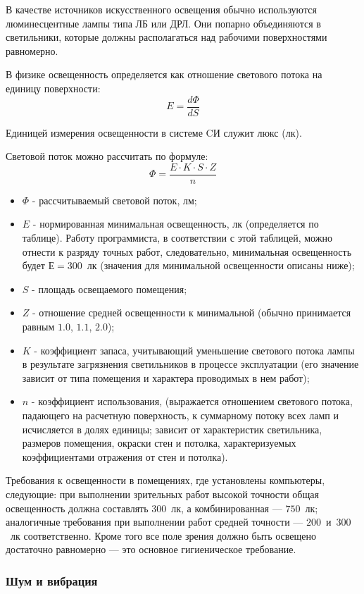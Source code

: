 В качестве источников искусственного освещения обычно
используются люминесцентные лампы типа ЛБ или ДРЛ. Они попарно
объединяются в светильники, которые должны располагаться над рабочими
поверхностями равномерно.

В физике освещенность определяется как отношение светового потока на
единицу поверхности:
\[
	E = \dfrac{d \Phi}{d S}
\]

Единицей измерения освещенности в системе CИ служит люкс (лк).

Световой поток можно рассчитать по формуле:
\[
	\Phi = \dfrac{E \cdot K \cdot S \cdot Z}{n}
\]

\begin{itemize}
	\item  $\Phi$ - рассчитываемый световой поток, лм;
	\item  $E$ - нормированная минимальная освещенность, лк (определяется по
		таблице). Работу программиста, в соответствии с этой таблицей, можно отнести
		к разряду точных работ, следовательно, минимальная освещенность будет $Е =
		300$~лк (значения для минимальной освещенности описаны ниже);
	\item  $S$ - площадь освещаемого помещения;
	\item  $Z$ - отношение средней освещенности к минимальной (обычно принимается равным $1.0$, $1.1$, $2.0$);
	\item  $K$ - коэффициент запаса, учитывающий уменьшение светового потока
		лампы в результате загрязнения светильников в процессе эксплуатации 
		(его значение зависит от типа помещения и характера проводимых в нем работ);
	\item  $n$ - коэффициент использования, (выражается отношением светового
		потока, падающего на расчетную поверхность, к суммарному потоку всех ламп
		и исчисляется в долях единицы; зависит от характеристик светильника,
		размеров помещения, окраски стен и потолка, характеризуемых
		коэффициентами отражения от стен и потолка).
\end{itemize}

Требования к освещенности в помещениях, где установлены компьютеры,
следующие: при выполнении зрительных работ высокой точности общая
освещенность должна составлять $300$~лк, а комбинированная --- $750$~лк;
аналогичные требования при выполнении работ средней точности --- $200$~и~$300$~лк
соответственно.
Кроме того все поле зрения должно быть освещено достаточно равномерно ---
это основное гигиеническое требование.

\subsubsection{Шум и вибрация}


